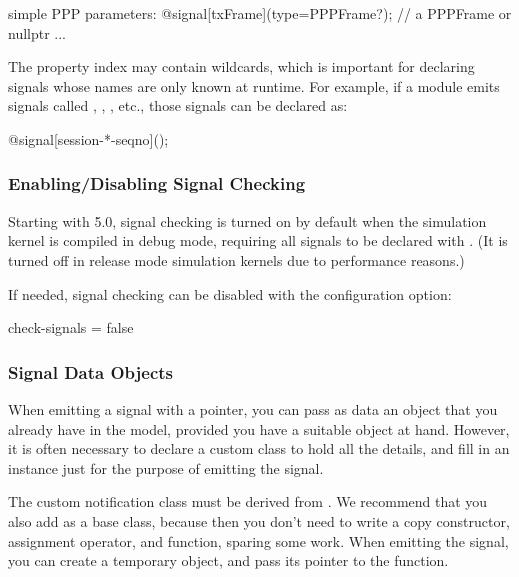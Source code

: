 \begin{ned}
simple PPP
{
    parameters:
        @signal[txFrame](type=PPPFrame?);  // a PPPFrame or nullptr
        ...
}
\end{ned}

The property index may contain wildcards, which is important for declaring
signals whose names are only known at runtime. For example, if a module emits
signals called , , ,
etc., those signals can be declared as:

\begin{ned}
    @signal[session-*-seqno]();
\end{ned}


\subsubsection{Enabling/Disabling Signal Checking}
\label{sec:simple-modules:enabling-signal-checking}

Starting with {\opp} 5.0, signal checking is turned on by default when the
simulation kernel is compiled in debug mode, requiring all signals to be
declared with . (It is turned off in release mode
simulation kernels due to performance reasons.)

If needed, signal checking can be disabled with the 
configuration option:

\begin{inifile}
check-signals = false
\end{inifile}


\subsubsection{Signal Data Objects}
\label{sec:simple-modules:signal-data-objects}

When emitting a signal with a  pointer, you can pass as data
an object that you already have in the model, provided you have a suitable
object at hand. However, it is often necessary to declare a custom class
to hold all the details, and fill in an instance just for the purpose of
emitting the signal.

The custom notification class must be derived from .
We recommend that you also add  as a base class, because
then you don't need to write a copy constructor, assignment operator, and
 function, sparing some work. When emitting the signal, you
can create a temporary object, and pass its pointer to the 
function.

